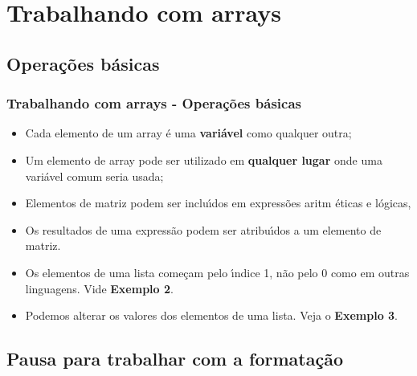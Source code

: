\documentclass[notes=show]{beamer}
\begin{document}
\section{Trabalhando com arrays}

\subsection{Opera\c{c}\~{o}es básicas}

\begin{frame}%

\frametitle{Trabalhando com arrays - Operações básicas}

\begin{itemize}
\item Cada elemento de um array \'{e} uma \textbf{vari\'{a}vel} como
qualquer outra;

\item Um elemento de array pode ser utilizado em \textbf{qualquer lugar}
onde uma vari\'{a}vel comum seria usada;

\item Elementos de matriz podem ser inclu\'{\i}dos em express\~{o}es aritm%
\'{e}ticas e l\'{o}gicas,

\item Os resultados de uma express\~{a}o podem ser atribu\'{\i}dos a um
elemento de matriz.

\item Os elementos de uma lista come\c{c}am pelo \'{\i}ndice 1, n\~{a}o pelo
0 como em outras linguagens. Vide \textbf{Exemplo 2}.

\item Podemos alterar os valores dos elementos de uma lista. Veja o \textbf{%
Exemplo 3}.
\end{itemize}

\transboxout%
\end{frame}%

\subsection{Pausa para trabalhar com a formata\c{c}\~{a}o}
\end{document}
